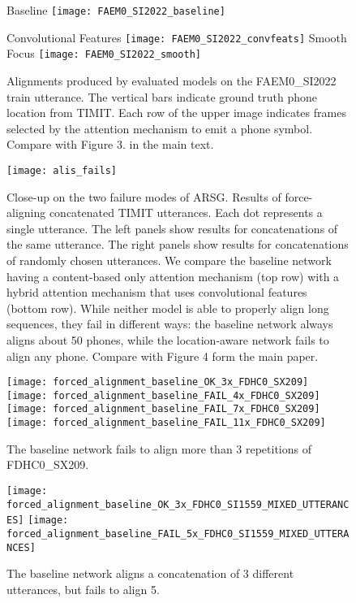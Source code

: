 \documentclass{article}
\begin{document}
\begin{figure}[h]
  \centering
  Baseline
  \texttt{[image: FAEM0\_SI2022\_baseline]}

  Convolutional Features
  \texttt{[image: FAEM0\_SI2022\_convfeats]}
  Smooth Focus
  \texttt{[image: FAEM0\_SI2022\_smooth]}
\caption{Alignments
      produced by evaluated models on the FAEM0\_SI2022 train utterance. The vertical bars
      indicate ground truth phone location from TIMIT. Each
      row of the upper image indicates frames selected by
      the attention mechanism to emit a phone symbol. Compare with
      Figure 3. in the main text.
  }  

  \vspace{-4mm}
\end{figure}



\begin{figure}[h]
  \centering
  \texttt{[image: alis\_fails]}
  \caption[Results of force-aligning of long utterances.]{Close-up on
    the two failure modes of ARSG. Results of
    force-aligning concatenated TIMIT utterances. Each dot represents
    a single utterance. The left panels show results for
    concatenations of the same utterance. The right panels show
    results for concatenations of randomly chosen utterances. We
    compare the baseline network having a content-based only attention
    mechanism (top row) with a hybrid attention mechanism that uses
    convolutional features (bottom row). While neither model is able
    to properly align long sequences, they fail in different ways: the
    baseline network always aligns about 50 phones, while the
    location-aware network fails to align any phone. Compare with
    Figure 4 form the main paper.}
\end{figure}

\begin{sidewaysfigure}[h]
  \texttt{[image: forced\_alignment\_baseline\_OK\_3x\_FDHC0\_SX209]}
  \texttt{[image: forced\_alignment\_baseline\_FAIL\_4x\_FDHC0\_SX209]}
  \texttt{[image: forced\_alignment\_baseline\_FAIL\_7x\_FDHC0\_SX209]}
  \texttt{[image: forced\_alignment\_baseline\_FAIL\_11x\_FDHC0\_SX209]}
  \caption{The baseline network fails to align more than 3 repetitions
    of FDHC0\_SX209.}
\end{sidewaysfigure}

\begin{sidewaysfigure}[h]
  \texttt{[image: forced\_alignment\_baseline\_OK\_3x\_FDHC0\_SI1559\_MIXED\_UTTERANCES]}
  \texttt{[image: forced\_alignment\_baseline\_FAIL\_5x\_FDHC0\_SI1559\_MIXED\_UTTERANCES]}
  \caption{The baseline network aligns a concatenation of 3 different
    utterances, but fails to align 5.}
\end{sidewaysfigure}
\end{document}
